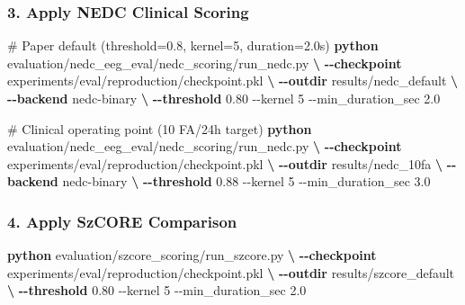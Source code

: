 \documentclass[
  10pt,
]{article}
\newenvironment{Shaded}{\begin{snugshade}}{\end{snugshade}}
\newcommand{\CommentTok}[1]{\textcolor[rgb]{0.54,0.53,0.53}{#1}}
\newcommand{\ExtensionTok}[1]{\textcolor[rgb]{0.00,0.58,1.00}{\textbf{#1}}}
\newcommand{\KeywordTok}[1]{\textcolor[rgb]{0.12,0.11,0.11}{\textbf{#1}}}
\newcommand{\NormalTok}[1]{\textcolor[rgb]{0.12,0.11,0.11}{#1}}
\begin{document}
\hypertarget{apply-nedc-clinical-scoring}{%
\subsubsection{3. Apply NEDC Clinical
Scoring}\label{apply-nedc-clinical-scoring}}

\begin{Shaded}
\begin{Highlighting}[]
\CommentTok{\# Paper default (threshold=0.8, kernel=5, duration=2.0s)}
\ExtensionTok{python}\NormalTok{ evaluation/nedc\_eeg\_eval/nedc\_scoring/run\_nedc.py }\KeywordTok{\textbackslash{}}
  \ExtensionTok{{-}{-}checkpoint}\NormalTok{ experiments/eval/reproduction/checkpoint.pkl }\KeywordTok{\textbackslash{}}
  \ExtensionTok{{-}{-}outdir}\NormalTok{ results/nedc\_default }\KeywordTok{\textbackslash{}}
  \ExtensionTok{{-}{-}backend}\NormalTok{ nedc{-}binary }\KeywordTok{\textbackslash{}}
  \ExtensionTok{{-}{-}threshold}\NormalTok{ 0.80 {-}{-}kernel 5 {-}{-}min\_duration\_sec 2.0}

\CommentTok{\# Clinical operating point (10 FA/24h target)}
\ExtensionTok{python}\NormalTok{ evaluation/nedc\_eeg\_eval/nedc\_scoring/run\_nedc.py }\KeywordTok{\textbackslash{}}
  \ExtensionTok{{-}{-}checkpoint}\NormalTok{ experiments/eval/reproduction/checkpoint.pkl }\KeywordTok{\textbackslash{}}
  \ExtensionTok{{-}{-}outdir}\NormalTok{ results/nedc\_10fa }\KeywordTok{\textbackslash{}}
  \ExtensionTok{{-}{-}backend}\NormalTok{ nedc{-}binary }\KeywordTok{\textbackslash{}}
  \ExtensionTok{{-}{-}threshold}\NormalTok{ 0.88 {-}{-}kernel 5 {-}{-}min\_duration\_sec 3.0}
\end{Highlighting}
\end{Shaded}

\hypertarget{apply-szcore-comparison}{%
\subsubsection{4. Apply SzCORE
Comparison}\label{apply-szcore-comparison}}

\begin{Shaded}
\begin{Highlighting}[]
\ExtensionTok{python}\NormalTok{ evaluation/szcore\_scoring/run\_szcore.py }\KeywordTok{\textbackslash{}}
  \ExtensionTok{{-}{-}checkpoint}\NormalTok{ experiments/eval/reproduction/checkpoint.pkl }\KeywordTok{\textbackslash{}}
  \ExtensionTok{{-}{-}outdir}\NormalTok{ results/szcore\_default }\KeywordTok{\textbackslash{}}
  \ExtensionTok{{-}{-}threshold}\NormalTok{ 0.80 {-}{-}kernel 5 {-}{-}min\_duration\_sec 2.0}
\end{Highlighting}
\end{Shaded}
\end{document}
